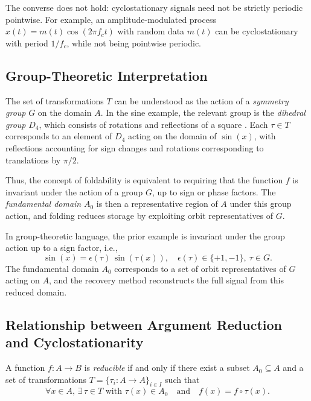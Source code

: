 The converse does not hold: cyclostationary signals need not be strictly periodic pointwise.
For example, an amplitude-modulated process $x(t) = m(t)\cos(2\pi f_c t)$ with random data $m(t)$ can be cyclostationary with period $1/f_c$, while not being pointwise periodic.

\subsection{Group-Theoretic Interpretation}
The set of transformations $T$ can be understood as the action of a \emph{symmetry group} $G$ on the domain $A$. In the sine example, the relevant group is the \emph{dihedral group} $D_4$, which consists of rotations and reflections of a square \cite{armstrong1988groups, gallian2021contemporary}.
Each $\tau \in T$ corresponds to an element of $D_4$ acting on the domain of $\sin(x)$, with reflections accounting for sign changes and rotations corresponding to translations by $\pi/2$.

Thus, the concept of foldability is equivalent to requiring that the function $f$ is invariant under the action of a group $G$, up to sign or phase factors. The \emph{fundamental domain} $A_0$ is then a representative region of $A$ under this group action, and folding reduces storage by exploiting orbit representatives of $G$.

In group-theoretic language, the prior example is invariant under the group action up to a sign factor, i.e.,
\[
\sin(x) = \epsilon(\tau) \, \sin(\tau(x)), \quad \epsilon(\tau) \in \{+1, -1\}, \ \tau \in G.
\]
The fundamental domain $A_0$ corresponds to a set of orbit representatives of $G$ acting on $A$, and the recovery method reconstructs the full signal from this reduced domain.

\subsection{Relationship between Argument Reduction and Cyclostationarity}

\begin{lemma}\label{eq:reducible_function}
A function $f: A \to B$ is \emph{reducible} if and only if there exist a subset $A_0 \subseteq A$ and a set of transformations $T = \{ \tau_i : A \to A \}_{i \in I}$ such that
\[
\forall x \in A, \, \exists \, \tau \in T \text{ with } \tau(x) \in A_0
\quad \text{and} \quad f(x) = f \circ \tau(x).
\]
\end{lemma}

